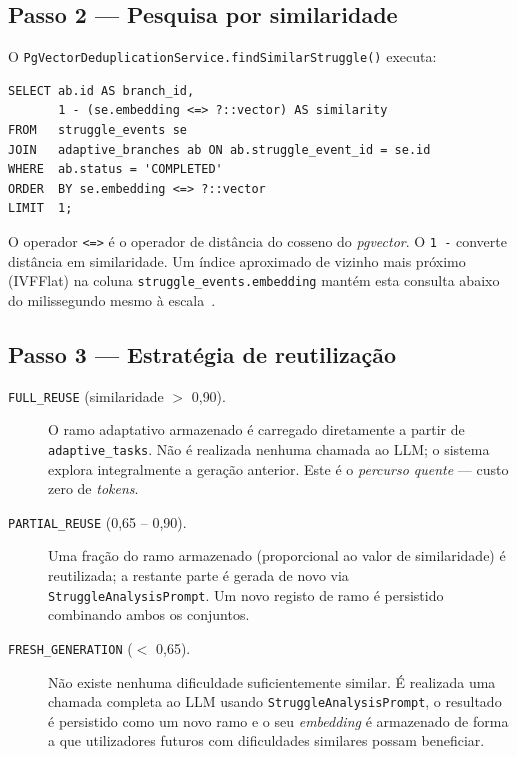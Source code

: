 \subsection*{Passo 2 — Pesquisa por similaridade}

O \texttt{PgVectorDeduplicationService.findSimilarStruggle()} executa:

\begin{verbatim}
SELECT ab.id AS branch_id,
       1 - (se.embedding <=> ?::vector) AS similarity
FROM   struggle_events se
JOIN   adaptive_branches ab ON ab.struggle_event_id = se.id
WHERE  ab.status = 'COMPLETED'
ORDER  BY se.embedding <=> ?::vector
LIMIT  1;
\end{verbatim}

O operador \texttt{<=>} é o operador de distância do cosseno do
\textit{pgvector}.
O \texttt{1 -} converte distância em similaridade.
Um índice aproximado de vizinho mais próximo (IVFFlat) na coluna
\texttt{struggle\_events.embedding} mantém esta consulta abaixo do
milissegundo mesmo à escala~\cite{johnson2019billion}.

\subsection*{Passo 3 — Estratégia de reutilização}

\begin{description}
  \item[\texttt{FULL\_REUSE} (similaridade $>$ 0{,}90).]
    O ramo adaptativo armazenado é carregado diretamente a partir de
    \texttt{adaptive\_tasks}.
    Não é realizada nenhuma chamada ao LLM; o sistema explora
    integralmente a geração anterior.
    Este é o \textit{percurso quente} — custo zero de \textit{tokens}.

  \item[\texttt{PARTIAL\_REUSE} (0{,}65 -- 0{,}90).]
    Uma fração do ramo armazenado (proporcional ao valor de similaridade)
    é reutilizada; a restante parte é gerada de novo via
    \texttt{StruggleAnalysisPrompt}.
    Um novo registo de ramo é persistido combinando ambos os conjuntos.

  \item[\texttt{FRESH\_GENERATION} ($<$ 0{,}65).]
    Não existe nenhuma dificuldade suficientemente similar.
    É realizada uma chamada completa ao LLM usando
    \texttt{StruggleAnalysisPrompt}, o resultado é persistido como um
    novo ramo e o seu \textit{embedding} é armazenado de forma a que
    utilizadores futuros com dificuldades similares possam beneficiar.
\end{description}

